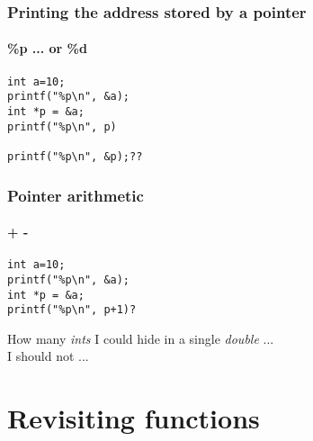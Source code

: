 \documentclass[10pt]{beamer}
\begin{document}
\begin{frame}[fragile]
  \frametitle{Printing the address stored by a pointer}
  \framesubtitle{\%p ... or \%d}
\begin{lstlisting}
int a=10;
printf("%p\n", &a);
int *p = &a;
printf("%p\n", p)

printf("%p\n", &p);??
\end{lstlisting}
\end{frame}

\begin{frame}[fragile]
  \frametitle{Pointer arithmetic}
  \framesubtitle{+ -}
\begin{lstlisting}
int a=10;
printf("%p\n", &a);
int *p = &a;
printf("%p\n", p+1)?
\end{lstlisting}

How many \textit{ints} I could hide in a single \textit{double} ...\\
I should not ...

\end{frame}

\section{Revisiting functions}
\end{document}
